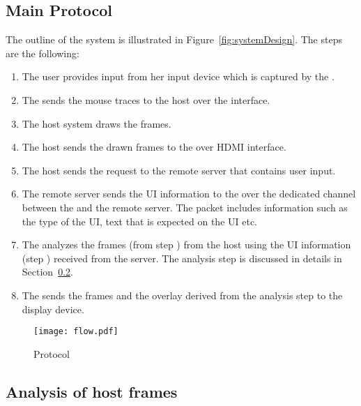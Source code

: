 \subsection{Main Protocol}

The outline of the system is illustrated in Figure~\ref{fig:systemDesign}. The steps are the following:


\begin{enumerate}
  \item[\one] The user provides input from her input device which is captured by the \device.
  \item[\two] The \device sends the mouse traces to the host over the \bluetooth interface.
  \item[\three] The host system draws the frames.
  \item[\four] The host sends the drawn frames to the \device over HDMI interface.
  \item[\five] The host sends the \http request to the remote server that contains user input. 
  \item[\six] The remote server sends the UI information to the \device over the dedicated \tls channel between the \device and the remote server. The packet includes information such as the type of the UI, text that is expected on the UI etc.
  \item[\seven] The \device analyzes the frames (from step \four) from the host using the UI information (step \six) received from the server. The analysis step is discussed in details in Section~\ref{sec:systemnDesign:analysis}.
  \item[\eight] The \device sends the frames and the overlay derived from the analysis step to the display device.

\end{enumerate}



\begin{figure}[t]
\centering
\texttt{[image: flow.pdf]}
\caption{Protocol}
\label{fig:protocol}
\end{figure}

\subsection{Analysis of host frames}
\label{sec:systemnDesign:analysis}

